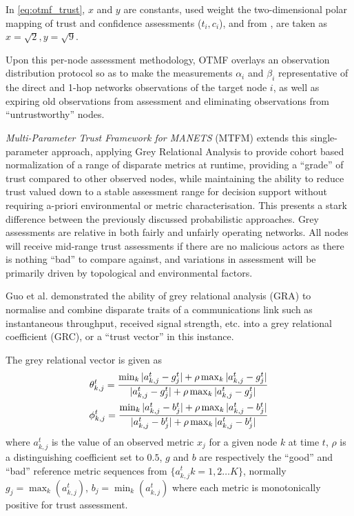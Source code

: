 \documentclass{aamas2016}
\begin{document}
In \eqref{eq:otmf_trust}, $x$ and $y$ are constants, used weight the two-dimensional polar mapping of trust and confidence assessments ($t_i,c_i$), and from \cite{Zouridaki2005}, are taken as $x=\sqrt{2},y=\sqrt{9}$.

Upon this per-node assessment methodology, OTMF overlays an observation distribution protocol so as to make the measurements $\alpha_i$ and $\beta_i$ representative of the direct and 1-hop networks observations of the target node $i$, as well as expiring old observations from assessment and eliminating observations from ``untrustworthy'' nodes.


\textit{Multi-Parameter Trust Framework for MANETS} (MTFM) extends this single-parameter approach, applying Grey Relational Analysis \cite{Zuo1995} to provide cohort based normalization of a range of disparate metrics at runtime, providing a ``grade'' of trust compared to other observed nodes, while maintaining the ability to reduce trust valued down to a stable assessment range for decision support without requiring a-priori environmental or metric characterisation. This presents a stark difference between the previously discussed probabilistic approaches. Grey assessments are relative in both fairly and unfairly operating networks. All nodes will receive mid-range trust assessments if there are no malicious actors as there is nothing ``bad'' to compare against, and variations in assessment will be primarily driven by topological and environmental factors.

Guo et al. \cite{Guo11} demonstrated the ability of grey relational analysis (GRA) \cite{Zuo1995} to normalise and combine disparate traits of a communications link such as instantaneous throughput, received signal strength, etc. into a grey relational coefficient (GRC), or a ``trust vector'' in this instance.

The grey relational vector is given as
%
\begin{align}
\label{eq:grc}
\theta_{k,j}^t = \frac{\min_k|a_{k,j}^t - g_j^t| + \rho \max_k|a_{k,j}^t-g_j^t|}{|a_{k,j}^t-g_j^t| + \rho \max_k|a_{k,j}^t-g_j^t|} \\
\phi_{k,j}^t = \frac{\min_k|a_{k,j}^t - b_j^t| + \rho \max_k|a_{k,j}^t-b_j^t|}{|a_{k,j}^t-b_j^t| + \rho \max_k|a_{k,j}^t-b_j^t|} \notag 
\end{align}
%
where $a_{k,j}^t$ is the value of an observed metric $x_j$ for a given node $k$ at time $t$, $\rho$ is a distinguishing coefficient set to $0.5$, $g$ and $b$ are respectively the ``good'' and ``bad'' reference metric sequences from $\{a_{k,j}^t k=1,2\dots K\}$, normally $g_j=\max_k({a_{k,j}^t})$,  $b_j=\min_k({a_{k,j}^t})$ where each metric is monotonically positive for trust assessment. 
\end{document}
